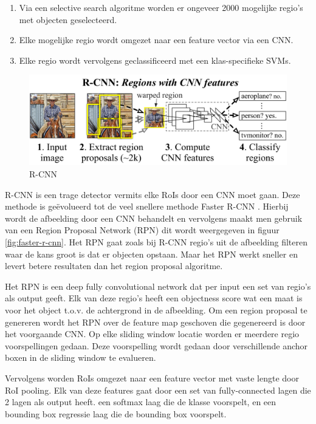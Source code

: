 \begin{enumerate}
    \item Via een selective search algoritme \cite{uijlings_selective_2013} worden er ongeveer 2000 mogelijke regio's met objecten geselecteerd.
    \item Elke mogelijke regio wordt omgezet naar een feature vector via een CNN.
    \item Elke regio wordt vervolgens geclassificeerd met een klas-specifieke SVMs.
\end{enumerate}

\begin{figure}[!ht]
	\centering
	\includegraphics[width=0.70\linewidth]{fig/R-CNN.jpg}
	\caption{R-CNN}
	\label{fig:r-cnn}
\end{figure}

R-CNN is een trage detector vermits elke RoIs door een CNN moet gaan. 
Deze methode is ge\"evolueerd tot de veel snellere methode Faster R-CNN \cite{ren_faster_2016}. 
Hierbij wordt de afbeelding door een CNN behandelt en vervolgens maakt men gebruik van een Region Proposal Network (RPN) dit wordt weergegeven in figuur \ref{fig:faster-r-cnn}. 
Het RPN gaat zoals bij R-CNN regio's uit de afbeelding filteren waar de kans groot is dat er objecten opstaan.
Maar het RPN werkt sneller en levert betere resultaten dan het region proposal algoritme. 

Het RPN is een deep fully convolutional network dat per input een set van regio's als output geeft.
Elk van deze regio's heeft een objectness score wat een maat is voor het object t.o.v. de achtergrond in de afbeelding.
Om een region proposal te genereren wordt het RPN over de feature map geschoven die gegenereerd is door het voorgaande CNN.
Op elke sliding window locatie worden er meerdere regio voorspellingen gedaan.
Deze voorspelling wordt gedaan door verschillende anchor boxen in de sliding window te evalueren.

Vervolgens worden RoIs omgezet naar een feature vector met vaste lengte door RoI pooling.
Elk van deze features gaat door een set van fully-connected lagen die 2 lagen als output heeft.
een softmax laag die de klasse voorspelt, en een bounding box regressie laag die de bounding box voorspelt.

